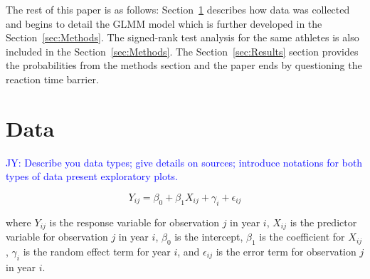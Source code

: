 \documentclass[12pt, letterpaper, titlepage]{article}
\newcommand{\jy}[1]{\textcolor{blue}{JY: #1}}
\begin{document}
The rest of this paper is as follows: Section~\ref{sec:Data} describes how data was
collected and begins to detail the GLMM model which is further developed in the
Section~\ref{sec:Methods}.  The signed-rank test analysis for the same athletes is
also included in the Section~\ref{sec:Methods}.  The Section~\ref{sec:Results}
section provides the probabilities from the methods section and the paper ends 
by questioning the reaction time barrier.








\section{Data} \label{sec:Data}

\jy{Describe you data types; give details on sources; introduce notations for
  both types of data
  present exploratory plots.}

  \begin{equation}
    Y_{ij} = \beta_0 + \beta_1 X_{ij} + \gamma_i + \epsilon_{ij}
  \end{equation}
    
    where $Y_{ij}$ is the response variable for observation $j$ in year $i$, 
    $X_{ij}$ is the predictor variable for observation $j$ in year $i$, 
    $\beta_0$ is the intercept, $\beta_1$ is the coefficient for $X_{ij}$, 
    $\gamma_i$ is the random effect term for year $i$, and $\epsilon_{ij}$ 
    is the error term for observation $j$ in year $i$.
\end{document}
